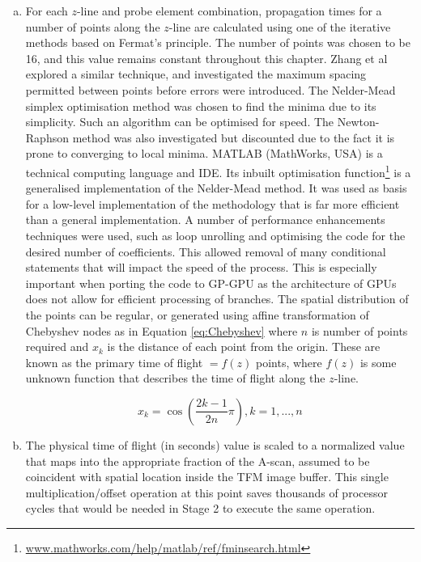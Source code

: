 \begin{enumerate}[a)]
\item For each $z$-line and probe element combination, propagation times for a number of points along the $z$-line are calculated using one of the iterative methods based on Fermat's principle. The number of points was chosen to be 16, and this value remains constant throughout this chapter. Zhang et al explored a similar technique\cite{zhang_efficient_2014}, and investigated the maximum spacing permitted between points before errors were introduced. The Nelder-Mead simplex optimisation method was chosen to find the minima due to its simplicity. Such an algorithm can be optimised for speed. The Newton-Raphson method was also investigated but discounted due to the fact it is prone to converging to local minima. MATLAB (MathWorks, USA) is a technical computing language and IDE. Its inbuilt optimisation function\footnote{\url{www.mathworks.com/help/matlab/ref/fminsearch.html}} is a generalised implementation of the Nelder-Mead method. It was used as basis for a low-level implementation of the methodology that is far more efficient than a general implementation. A number of performance enhancements techniques were used, such as loop unrolling and optimising the code for the desired number of coefficients. This allowed removal of many conditional statements that will impact the speed of the process. This is especially important when porting the code to GP-GPU as the architecture of GPUs does not allow for efficient processing of branches. The spatial distribution of the points can be regular, or generated using affine transformation of Chebyshev nodes as in Equation \ref{eq:Chebyshev} where $n$ is number of points required and $x_k$ is the distance of each point from the origin. These are known as the primary time of flight $= f(z)$ points, where $f(z)$ is some unknown function that describes the time of flight along the $z$-line. 

\begin{equation} \label{eq:Chebyshev}
x_k = \cos \left( \frac{2k - 1}{2n} \pi \right) , k = 1, ... , n 
 \end{equation}



\item The physical time of flight (in seconds) value is scaled to a normalized value that maps into the appropriate fraction of the A-scan, assumed to be coincident with spatial location inside the TFM image buffer.  This single multiplication/offset operation at this point saves thousands of processor cycles that would be needed in Stage 2 to execute the same operation.
\end{enumerate}
